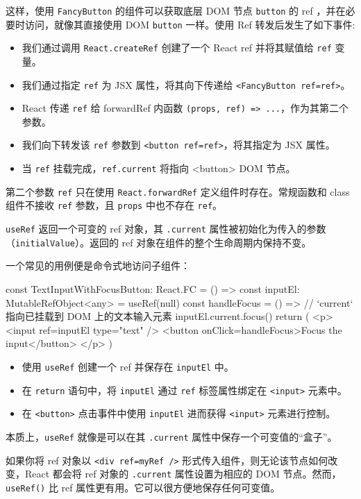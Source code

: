 这样，使用 \texttt{FancyButton} 的组件可以获取底层 DOM 节点 \texttt{button} 的 ref ，并在必要时访问，就像其直接使用 DOM \texttt{button} 一样。使用 Ref 转发后发生了如下事件:

\begin{itemize}
  \item 我们通过调用 \texttt{React.createRef} 创建了一个 React ref 并将其赋值给 \texttt{ref} 变量。
  \item 我们通过指定 \texttt{ref} 为 JSX 属性，将其向下传递给 \texttt{<FancyButton ref={ref}>}。
  \item React 传递 \texttt{ref} 给 forwardRef 内函数 \texttt{(props, ref) => ...}，作为其第二个参数。
  \item 我们向下转发该 \texttt{ref} 参数到 \texttt{<button ref={ref}>}，将其指定为 JSX 属性。
  \item 当 \texttt{ref} 挂载完成，\texttt{ref.current} 将指向 <button> DOM 节点。
\end{itemize}

第二个参数 \texttt{ref} 只在使用 \texttt{React.forwardRef} 定义组件时存在。常规函数和 class 组件不接收 \texttt{ref} 参数，且 \texttt{props} 中也不存在 \texttt{ref}。

\texttt{useRef} 返回一个可变的 ref 对象，其 \texttt{.current} 属性被初始化为传入的参数（\texttt{initialValue}）。返回的 ref 对象在组件的整个生命周期内保持不变。

一个常见的用例便是命令式地访问子组件：

\begin{JavaScript}
const TextInputWithFocusButton: React.FC = () => {
  const inputEl: MutableRefObject<any> = useRef(null)
  const handleFocus = () => {
    // `current` 指向已挂载到 DOM 上的文本输入元素
    inputEl.current.focus()
  }
  return (
    <p>
      <input ref={inputEl} type="text" />
      <button onClick={handleFocus}>Focus the input</button>
    </p>
  )
}
\end{JavaScript}

\begin{itemize}
  \item 使用 \texttt{useRef} 创建一个 ref 并保存在 \texttt{inputEl} 中。
  \item 在 \texttt{return} 语句中，将 \texttt{inputEl} 通过 \texttt{ref} 标签属性绑定在 \texttt{<input>} 元素中。
  \item 在 \texttt{<button>} 点击事件中使用 \texttt{inputEl} 进而获得 \texttt{<input>} 元素进行控制。
\end{itemize}

本质上，\texttt{useRef} 就像是可以在其 \texttt{.current} 属性中保存一个可变值的“盒子”。

如果你将 ref 对象以 \texttt{<div ref={myRef} />} 形式传入组件，则无论该节点如何改变，React 都会将 ref 对象的 \texttt{.current} 属性设置为相应的 DOM 节点。然而，\texttt{useRef()} 比 ref 属性更有用。它可以很方便地保存任何可变值。